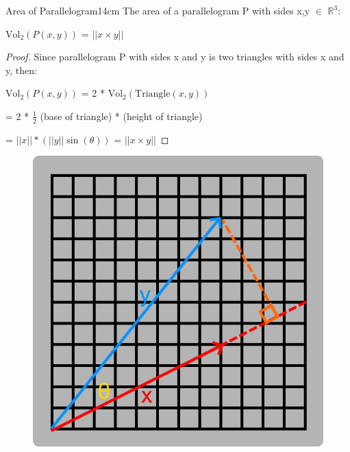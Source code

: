     \newpage



    \begin{wtheorem}{Area of Parallelogram}{14cm}
        The area of a parallelogram P with sides x,y $\in$ $\mathbb{R}^3$:

        \hspace{0.5cm}
        $\text{Vol}_2(P(x,y))$ = $||x \times y||$
    \end{wtheorem}

    \begin{proof}
        Since parallelogram P with sides x and y is two triangles with
        sides x and y, then:

        \hspace{0.5cm}
        $\text{Vol}_2(P(x,y))$
        = 2 * $\text{Vol}_2(\text{Triangle}(x,y))$
        
        \hspace{3cm}
        = 2 * $\frac{1}{2}$ (base of triangle) * (height of triangle)
      
        \hspace{3cm}
        = $||x|| * (||y||\sin(\theta))$
        = $||x \times y ||$
    \end{proof}

    \begin{figure}[h]
        \centering
        \includegraphics[scale=0.4]{Images/1.3.5.png}        
    \end{figure}




